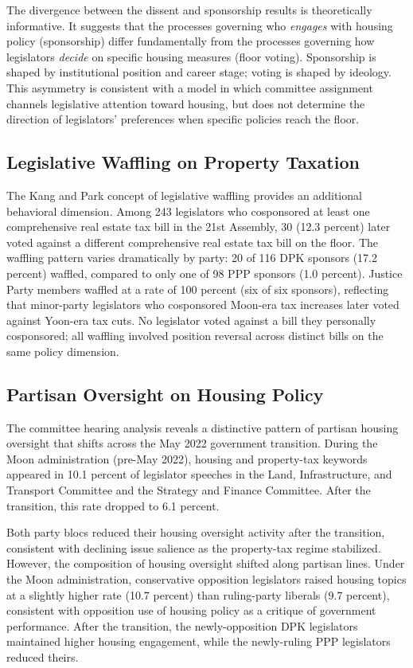 \documentclass[11pt]{article}
\begin{document}
The divergence between the dissent and sponsorship results is theoretically informative. It suggests that the processes governing who \textit{engages} with housing policy (sponsorship) differ fundamentally from the processes governing how legislators \textit{decide} on specific housing measures (floor voting). Sponsorship is shaped by institutional position and career stage; voting is shaped by ideology. This asymmetry is consistent with a model in which committee assignment channels legislative attention toward housing, but does not determine the direction of legislators' preferences when specific policies reach the floor.

\subsection{Legislative Waffling on Property Taxation}

The Kang and Park concept of legislative waffling provides an additional behavioral dimension. Among 243 legislators who cosponsored at least one comprehensive real estate tax bill in the 21st Assembly, 30 (12.3 percent) later voted against a different comprehensive real estate tax bill on the floor. The waffling pattern varies dramatically by party: 20 of 116 DPK sponsors (17.2 percent) waffled, compared to only one of 98 PPP sponsors (1.0 percent). Justice Party members waffled at a rate of 100 percent (six of six sponsors), reflecting that minor-party legislators who cosponsored Moon-era tax increases later voted against Yoon-era tax cuts. No legislator voted against a bill they personally cosponsored; all waffling involved position reversal across distinct bills on the same policy dimension.

\subsection{Partisan Oversight on Housing Policy}

The committee hearing analysis reveals a distinctive pattern of partisan housing oversight that shifts across the May 2022 government transition. During the Moon administration (pre-May 2022), housing and property-tax keywords appeared in 10.1 percent of legislator speeches in the Land, Infrastructure, and Transport Committee and the Strategy and Finance Committee. After the transition, this rate dropped to 6.1 percent.

Both party blocs reduced their housing oversight activity after the transition, consistent with declining issue salience as the property-tax regime stabilized. However, the composition of housing oversight shifted along partisan lines. Under the Moon administration, conservative opposition legislators raised housing topics at a slightly higher rate (10.7 percent) than ruling-party liberals (9.7 percent), consistent with opposition use of housing policy as a critique of government performance. After the transition, the newly-opposition DPK legislators maintained higher housing engagement, while the newly-ruling PPP legislators reduced theirs.
\end{document}
